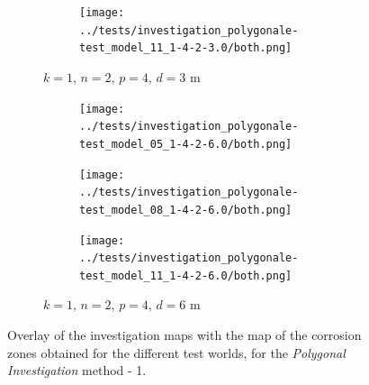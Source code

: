 \documentclass[english,RandD]{rapportPFE}  %
\begin{document}
\begin{figure}[H]
\begin{subfigure}[t]{\linewidth}
\begin{subfigure}[t]{0.2\linewidth}
					\texttt{[image: ../tests/investigation\_polygonale-test\_model\_11\_1-4-2-3.0/both.png]}
				\end{subfigure}
				\caption{$k = 1$, $n = 2$, $p = 4$, $d = 3$ m}
			\end{subfigure}
			\hfill
			\begin{subfigure}[t]{\linewidth}
				\centering
				\begin{subfigure}[t]{0.2\linewidth}
					\texttt{[image: ../tests/investigation\_polygonale-test\_model\_05\_1-4-2-6.0/both.png]}
				\end{subfigure}
				\hfill
				\begin{subfigure}[t]{0.2\linewidth}
					\texttt{[image: ../tests/investigation\_polygonale-test\_model\_08\_1-4-2-6.0/both.png]}
				\end{subfigure}
				\hfill
				\begin{subfigure}[t]{0.2\linewidth}
					\texttt{[image: ../tests/investigation\_polygonale-test\_model\_11\_1-4-2-6.0/both.png]}
				\end{subfigure}
				\caption{$k = 1$, $n = 2$, $p = 4$, $d = 6$ m}
			\end{subfigure}
			\caption{Overlay of the investigation maps with the map of the corrosion zones obtained for the different test worlds, for the \textit{Polygonal Investigation} method - 1.}
			\label{fig:investigation_polygonale_resultats}
		\end{figure}
\end{document}
